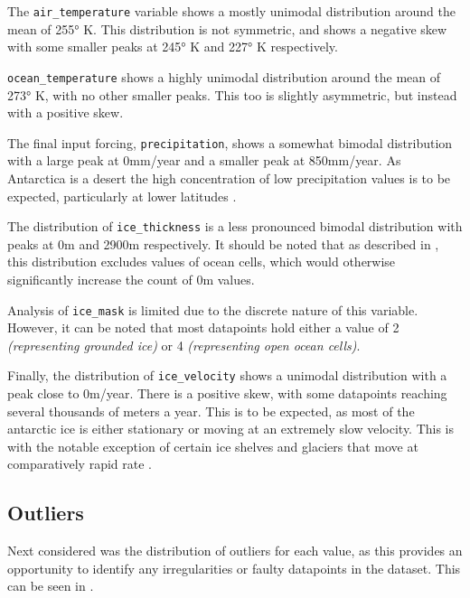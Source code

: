 The \texttt{air\_temperature} variable shows a mostly unimodal distribution around the mean of 255° K. This distribution is not symmetric, and shows a negative skew with some smaller peaks at 245° K and 227° K respectively.

\texttt{ocean\_temperature} shows a highly unimodal distribution around the mean of 273° K, with no other smaller peaks. This too is slightly asymmetric, but instead with a positive skew.

The final input forcing, \texttt{precipitation}, shows a somewhat bimodal distribution with a large peak at 0mm/year and a smaller peak at 850mm/year. As Antarctica is a desert the high concentration of low precipitation values is to be expected, particularly at lower latitudes \cite{Nicola2023}.

The distribution of \texttt{ice\_thickness} is a less pronounced bimodal distribution with peaks at 0m and 2900m respectively. It should be noted that as described in , this distribution excludes values of ocean cells, which would otherwise significantly increase the count of 0m values.

Analysis of \texttt{ice\_mask} is limited due to the discrete nature of this variable. However, it can be noted that most datapoints hold either a value of 2 \textit{(representing grounded ice)} or 4 \textit{(representing open ocean cells)}.

Finally, the distribution of \texttt{ice\_velocity} shows a unimodal distribution with a peak close to 0m/year. There is a positive skew, with some datapoints reaching several thousands of meters a year. This is to be expected, as most of the antarctic ice is either stationary or moving at an extremely slow velocity. This is with the notable exception of certain ice shelves and glaciers that move at comparatively rapid rate \cite{Mouginot2019}.

\subsection{Outliers}\label{SS:outliers}

Next considered was the distribution of outliers for each value, as this provides an opportunity to identify any irregularities or faulty datapoints in the dataset. This can be seen in .

